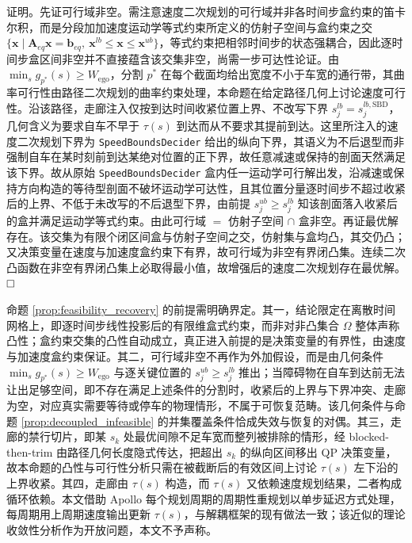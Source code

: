 \documentclass[a4paper,11pt]{ctexart}
\theoremstyle{definition}
\begin{document}
证明。先证可行域非空。需注意速度二次规划的可行域并非各时间步盒约束的笛卡尔积，而是分段加加速度运动学等式约束所定义的仿射子空间与盒约束之交 $\{\mathbf{x}\mid \mathbf{A}_{eq}\mathbf{x}=\mathbf{b}_{eq},\ \mathbf{x}^{lb}\le\mathbf{x}\le\mathbf{x}^{ub}\}$，等式约束把相邻时间步的状态强耦合，因此逐时间步盒区间非空并不直接蕴含该交集非空，尚需一步可达性论证。由 $\min_s g_{p^{*}}(s) \geq W_{\text{ego}}$，分割 $p^{*}$ 在每个截面均给出宽度不小于车宽的通行带，其曲率可行性由路径二次规划的曲率约束处理，本命题在给定路径几何上讨论速度可行性。沿该路径，走廊注入仅按到达时间收紧位置上界、不改写下界 $s_j^{lb}=s_j^{lb,\mathrm{SBD}}$，几何含义为要求自车不早于 $\tau(s)$ 到达而从不要求其提前到达。这里所注入的速度二次规划下界为 \texttt{SpeedBoundsDecider} 给出的纵向下界，其语义为不后退型而非强制自车在某时刻前到达某绝对位置的正下界，故任意减速或保持的剖面天然满足该下界。故从原始 \texttt{SpeedBoundsDecider} 盒内任一运动学可行解出发，沿减速或保持方向构造的等待型剖面不破坏运动学可达性，且其位置分量逐时间步不超过收紧后的上界、不低于未改写的不后退型下界，由前提 $s_j^{ub} \geq s_j^{lb}$ 知该剖面落入收紧后的盒并满足运动学等式约束。由此可行域 $=$ 仿射子空间 $\cap$ 盒非空。再证最优解存在。该交集为有限个闭区间盒与仿射子空间之交，仿射集与盒均凸，其交仍凸；又决策变量在速度与加速度盒约束下有界，故可行域为非空有界闭凸集。连续二次凸函数在非空有界闭凸集上必取得最小值，故增强后的速度二次规划存在最优解。$\hfill\Box$

命题 \ref{prop:feasibility_recovery} 的前提需明确界定。其一，结论限定在离散时间网格上，即逐时间步线性投影后的有限维盒式约束，而非对非凸集合 $\Omega$ 整体声称凸性；盒约束交集的凸性自动成立，真正进入前提的是决策变量的有界性，由速度与加速度盒约束保证。其二，可行域非空不再作为外加假设，而是由几何条件 $\min_s g_{p^{*}}(s) \geq W_{\text{ego}}$ 与逐关键位置的 $s_j^{ub} \geq s_j^{lb}$ 推出；当障碍物在自车到达前无法让出足够空间，即不存在满足上述条件的分割时，收紧后的上界与下界冲突、走廊为空，对应真实需要等待或停车的物理情形，不属于可恢复范畴。该几何条件与命题 \ref{prop:decoupled_infeasible} 的并集覆盖条件恰成失效与恢复的对偶。其三，走廊的禁行切片，即某 $s_k$ 处最优间隙不足车宽而整列被排除的情形，经 blocked-then-trim 由路径几何长度隐式传达，把超出 $s_k$ 的纵向区间移出 QP 决策变量，故本命题的凸性与可行性分析只需在被截断后的有效区间上讨论 $\tau(s)$ 左下沿的上界收紧。其四，走廊由 $\tau(s)$ 构造，而 $\tau(s)$ 又依赖速度规划结果，二者构成循环依赖。本文借助 Apollo 每个规划周期的周期性重规划以单步延迟方式处理，每周期用上周期速度输出更新 $\tau(s)$，与解耦框架的现有做法一致；该近似的理论收敛性分析作为开放问题，本文不予声称。
\end{document}
